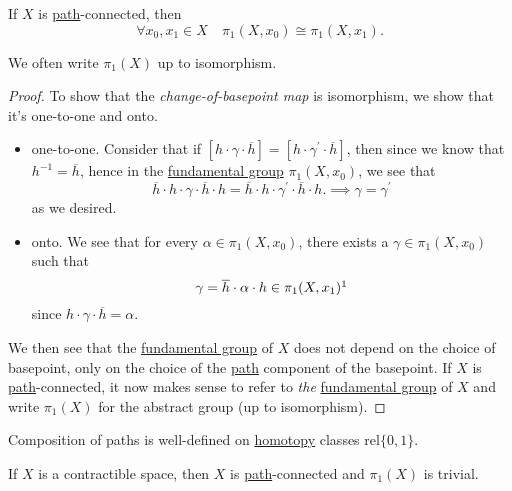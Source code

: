 \begin{theorem}
	If \(X\) is \hyperref[def:path]{path}-connected, then
	\[
		\forall x_0, x_1\in X\quad \pi_1(X, x_0)\cong \pi _1(X, x_1).
	\]
\end{theorem}
\begin{remark}
	We often write \(\pi _1(X)\) up to isomorphism.
\end{remark}
\begin{proof}
	\par To show that the \emph{change-of-basepoint map} is isomorphism, we show that it's one-to-one and onto.
	\begin{itemize}
		\item one-to-one. Consider that if \([h\cdot \gamma\cdot \overline{h} ] = [h\cdot \gamma ^\prime \cdot \overline{h} ]\), then since we know that \(h^{-1}  = \overline{h} \), hence
		      in the \hyperref[def:fundamental-group]{fundamental group} \(\pi _1(X, x_0)\), we see that
		      \[
			      \overline{h} \cdot h\cdot \gamma\cdot \overline{h} \cdot h = \overline{h} \cdot h\cdot \gamma ^\prime \cdot \overline{h} \cdot h. \implies \gamma = \gamma ^\prime
		      \]
		      as we desired.
		\item onto. We see that for every \(\alpha \in \pi_1(X, x_0)\), there exists a \(\gamma\in \pi_1(X, x_{0})\) such that
		      \[
			      \gamma = \overline{h} \cdot \alpha \cdot h\in \pi _1(X, x_1)\footnotemark
		      \]
		      since \(h\cdot \gamma\cdot \overline{h} =\alpha \).
	\end{itemize}

	\par We then see that the \hyperref[def:fundamental-group]{fundamental group} of \(X\) does not depend on the choice of basepoint, only on the choice of the \hyperref[def:path]{path} component of the basepoint.
	If \(X\) is \hyperref[def:path]{path}-connected, it now makes sense to refer to \emph{the} \hyperref[def:fundamental-group]{fundamental group} of \(X\) and write \(\pi _1(X)\) for the abstract group (up to isomorphism).
\end{proof}

\begin{exercise}
	Composition of paths is well-defined on \hyperref[def:homotopy]{homotopy} classes \hyperref[def:homotopy-relative]{\(\mathrm{rel} \{0, 1\}\)}.
\end{exercise}

\begin{exercise}
	If \(X\) is a contractible space, then \(X\) is \hyperref[def:path]{path}-connected and \(\pi _1(X)\)  is trivial.
\end{exercise}
